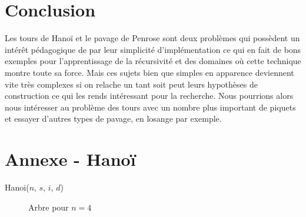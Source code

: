 \documentclass[a4paper,13pt]{article}
\begin{document}
\section{Conclusion}

Les tours de Hanoï et le pavage de Penrose sont deux problèmes qui possèdent un intérêt pédagogique de par leur simplicité d'implémentation ce qui en fait de bons exemples pour l'apprentissage de la récursivité et des domaines où cette technique montre toute sa force. Mais ces sujets bien que simples en apparence deviennent vite très complexes si on relache un tant soit peut leurs hypothèses de construction ce qui les rends intéressant pour la recherche.
Nous pourrions alors nous intéresser au problème des tours avec un nombre plus important de piquets et essayer d'autres types de pavage, en losange par exemple.

\appendix
\newpage
\section{Annexe - Hanoï}
\begin{algorithm}[H]
  \caption{Hanoi($n$, $s$, $i$, $d$)}
  \label{alg:hanoirec}
\end{algorithm}

\bigskip
\begin{figure}[h]
  \caption{Arbre pour $n=4$}
  \label{fig:arbre4}
  \begin{center}
\end{center}
\end{figure}
\end{document}
